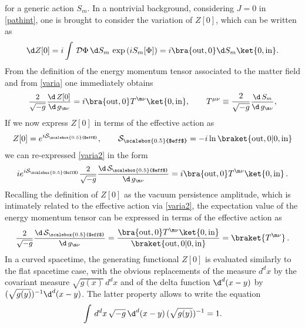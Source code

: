 \documentclass[a4paper,11pt,openright,twoside]{book}
\let\n=\nu      \let\x=\xi     \let\p=\pi      \let\r=\rho
\newcommand{\sdfrac}[2]{\mbox{\small$\displaystyle\frac{#1}{#2}$}}
\numberwithin{equation}{section}
\begin{document}
{{\begin{equation}
\end{equation}
for a generic action $S_m$.
{In a nontrivial background, considering $J=0$ in \eqref{pathint}, one is brought to consider the variation of $Z[0]$, which can be written as \cite{Schwinger452}
	\begin{equation}
		\d Z[0]=i\int\,\mathcal{D}\Phi\,\d S_m\,\exp\left(iS_m[\Phi]\right)=i\bra{\text{out},0}\d S_m\ket{0,\text{in}}\label{varia}.
	\end{equation}
	From the definition of the energy momentum tensor associated to the matter field and from \eqref{varia} one immediately obtains
	\begin{equation}
		\sdfrac{2}{\sqrt{-g}}\sdfrac{\d\,Z[0]}{\d\,g_{\m\n}}=i\bra{\text{out},0}T^{\m\n}\ket{0,\text{in}},\qquad T^{\mu\nu}\equiv\frac{2}{\sqrt{-g}}\sdfrac{\d\,S_m}{\d\,g_{\m\n}},\label{varia2}
	\end{equation}
	If we now express $Z[0]$ in terms of the effective action as
	\begin{equation}
		Z[0]=e^{i\mathcal{S}_{\scalebox{0.5}{$eff$}}},\qquad
		\mathcal{S}_{\scalebox{0.5}{$eff$}}=-i\ln\braket{\text{out},0|0,\text{in}}
	\end{equation}
	we can re-expressed \eqref{varia2} in the form
	\begin{equation}
		ie^{i\mathcal{S}_{\scalebox{0.5}{$eff$}}}\sdfrac{2}{\sqrt{-g}}\sdfrac{\d\,\mathcal{S}_{\scalebox{0.5}{$eff$}}}{\d\,g_{\m\n}}=i\bra{\text{out},0}T^{\m\n}\ket{0,\text{in}}\,.
	\end{equation}
	Recalling the definition of $Z[0]$ as the vacuum persistence amplitude, which is intimately related to the effective action via \eqref{varia2}, the expectation value of the energy momentum tensor can be expressed in terms of the effective action as
	\begin{equation}
		\sdfrac{2}{\sqrt{-g}}\sdfrac{\d\,\mathcal{S}_{\scalebox{0.5}{$eff$}}}{\d\,g_{\m\n}}=\frac{\bra{\text{out},0}T^{\m\n}\ket{0,\text{in}}}{\braket{\text{out},0|0,\text{in}}}=\braket{T^{\m\n}}\,.
	\end{equation}
	In a curved spacetime, the generating functional $Z[0]$ is evaluated similarly to the flat spacetime case, with the obvious replacements of the measure $d^dx$ by the covariant measure $\sqrt{g(x)}\,d^dx$ and of the delta function $\d^d(x-y)$ by $(\sqrt{g(y)})^{-1}\d^{d}(x-y)$. The latter property allows to write the equation
	\begin{equation}
		\int\,d^dx\,\sqrt{-g}\,\d^d(x-y)\,(\sqrt{g(y)})^{-1}=1.
	\end{equation}
}}}
\end{document}
